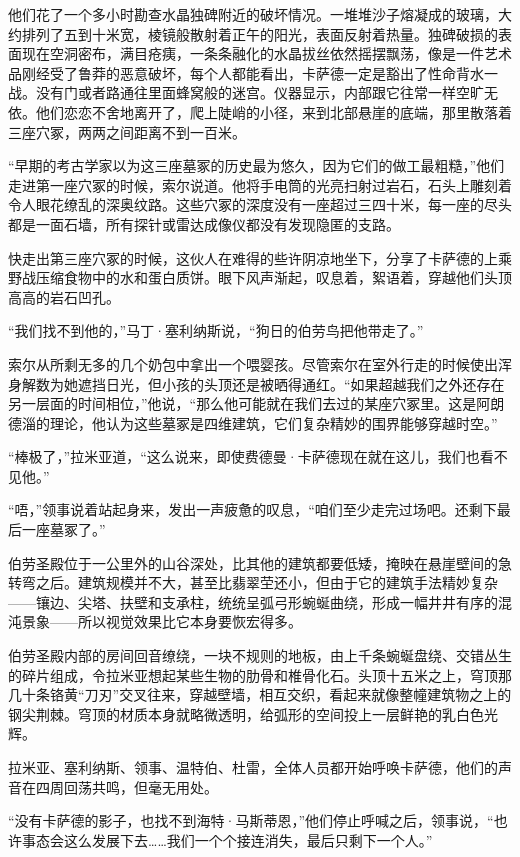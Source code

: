 \documentclass[AutoFakeBold=true]{book}
\begin{document}
他们花了一个多小时勘查水晶独碑附近的破坏情况。一堆堆沙子熔凝成的玻璃，大约排列了五到十米宽，棱镜般散射着正午的阳光，表面反射着热量。独碑破损的表面现在空洞密布，满目疮痍，一条条融化的水晶拔丝依然摇摆飘荡，像是一件艺术品刚经受了鲁莽的恶意破坏，每个人都能看出，卡萨德一定是豁出了性命背水一战。没有门或者路通往里面蜂窝般的迷宫。仪器显示，内部跟它往常一样空旷无依。他们恋恋不舍地离开了，爬上陡峭的小径，来到北部悬崖的底端，那里散落着三座穴冢，两两之间距离不到一百米。

``早期的考古学家以为这三座墓冢的历史最为悠久，因为它们的做工最粗糙，''他们走进第一座穴冢的时候，索尔说道。他将手电筒的光亮扫射过岩石，石头上雕刻着令人眼花缭乱的深奥纹路。这些穴冢的深度没有一座超过三四十米，每一座的尽头都是一面石墙，所有探针或雷达成像仪都没有发现隐匿的支路。

快走出第三座穴冢的时候，这伙人在难得的些许阴凉地坐下，分享了卡萨德的上乘野战压缩食物中的水和蛋白质饼。眼下风声渐起，叹息着，絮语着，穿越他们头顶高高的岩石凹孔。

``我们找不到他的，''马丁·塞利纳斯说，``狗日的伯劳鸟把他带走了。''

索尔从所剩无多的几个奶包中拿出一个喂婴孩。尽管索尔在室外行走的时候使出浑身解数为她遮挡日光，但小孩的头顶还是被晒得通红。``如果超越我们之外还存在另一层面的时间相位，''他说，``那么他可能就在我们去过的某座穴冢里。这是阿朗德淄的理论，他认为这些墓冢是四维建筑，它们复杂精妙的围界能够穿越时空。''

``棒极了，''拉米亚道，``这么说来，即使费德曼·卡萨德现在就在这儿，我们也看不见他。''

``唔，''领事说着站起身来，发出一声疲惫的叹息，``咱们至少走完过场吧。还剩下最后一座墓冢了。''

伯劳圣殿位于一公里外的山谷深处，比其他的建筑都要低矮，掩映在悬崖壁间的急转弯之后。建筑规模并不大，甚至比翡翠茔还小，但由于它的建筑手法精妙复杂——镶边、尖塔、扶壁和支承柱，统统呈弧弓形蜿蜒曲绕，形成一幅井井有序的混沌景象——所以视觉效果比它本身要恢宏得多。

伯劳圣殿内部的房间回音缭绕，一块不规则的地板，由上千条蜿蜒盘绕、交错丛生的碎片组成，令拉米亚想起某些生物的肋骨和椎骨化石。头顶十五米之上，穹顶那几十条铬黄``刀刃''交叉往来，穿越壁墙，相互交织，看起来就像整幢建筑物之上的钢尖荆棘。穹顶的材质本身就略微透明，给弧形的空间投上一层鲜艳的乳白色光辉。

拉米亚、塞利纳斯、领事、温特伯、杜雷，全体人员都开始呼唤卡萨德，他们的声音在四周回荡共鸣，但毫无用处。

``没有卡萨德的影子，也找不到海特·马斯蒂恩，''他们停止呼喊之后，领事说，``也许事态会这么发展下去……我们一个个接连消失，最后只剩下一个人。''
\end{document}
